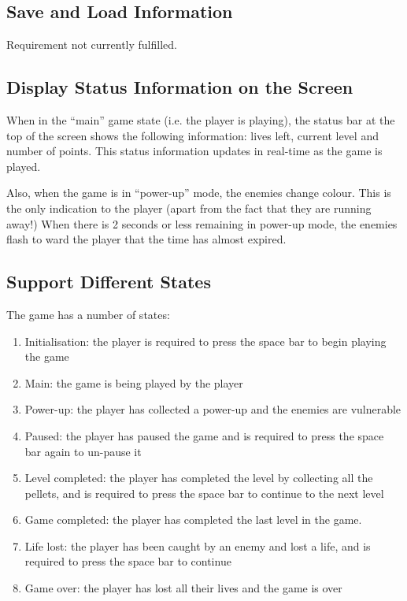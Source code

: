 \documentclass[a4paper,11pt]{article}
\begin{document}
    \subsection{Save and Load Information}

    Requirement not currently fulfilled.

    \subsection{Display Status Information on the Screen}

    When in the ``main'' game state (i.e. the player is playing), the status
    bar at the top of the screen shows the following information: lives left,
    current level and number of points. This status information updates in
    real-time as the game is played.

    Also, when the game is in ``power-up'' mode, the enemies change colour.
    This is the only indication to the player (apart from the fact that they
    are running away!) When there is 2 seconds or less remaining in power-up
    mode, the enemies flash to ward the player that the time has almost
    expired.

    \subsection{Support Different States}

    The game has a number of states:

    \begin{enumerate}
        \item Initialisation: the player is required to press the space bar to
            begin playing the game
        \item Main: the game is being played by the player
        \item Power-up: the player has collected a power-up and the enemies are
            vulnerable
        \item Paused: the player has paused the game and is required to press
            the space bar again to un-pause it
        \item Level completed: the player has completed the level by collecting
            all the pellets, and is required to press the space bar to continue
            to the next level
        \item Game completed: the player has completed the last level in the
            game.
        \item Life lost: the player has been caught by an enemy and lost
            a life, and is required to press the space bar to continue
        \item Game over: the player has lost all their lives and the game is
            over
    \end{enumerate}
\end{document}
